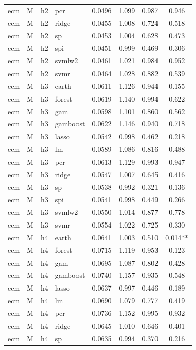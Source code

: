 \begin{ThreePartTable}
\begin{longtable}[t]{llclcccc}
ecm & M & h2 & pcr & 0.0496 & 1.099 & 0.987 & 0.946\\
ecm & M & h2 & ridge & 0.0455 & 1.008 & 0.724 & 0.518\\
ecm & M & h2 & sp & 0.0453 & 1.004 & 0.628 & 0.473\\
ecm & M & h2 & spi & 0.0451 & 0.999 & 0.469 & 0.306\\
ecm & M & h2 & svmlw2 & 0.0461 & 1.021 & 0.984 & 0.952\\
ecm & M & h2 & svmr & 0.0464 & 1.028 & 0.882 & 0.539\\
\addlinespace
ecm & M & h3 & earth & 0.0611 & 1.126 & 0.944 & 0.155\\
ecm & M & h3 & forest & 0.0619 & 1.140 & 0.994 & 0.622\\
ecm & M & h3 & gam & 0.0598 & 1.101 & 0.860 & 0.562\\
ecm & M & h3 & gamboost & 0.0622 & 1.146 & 0.940 & 0.718\\
ecm & M & h3 & lasso & 0.0542 & 0.998 & 0.462 & 0.218\\
ecm & M & h3 & lm & 0.0589 & 1.086 & 0.816 & 0.488\\
ecm & M & h3 & pcr & 0.0613 & 1.129 & 0.993 & 0.947\\
ecm & M & h3 & ridge & 0.0547 & 1.007 & 0.645 & 0.416\\
ecm & M & h3 & sp & 0.0538 & 0.992 & 0.321 & 0.136\\
ecm & M & h3 & spi & 0.0541 & 0.998 & 0.449 & 0.266\\
ecm & M & h3 & svmlw2 & 0.0550 & 1.014 & 0.877 & 0.778\\
ecm & M & h3 & svmr & 0.0554 & 1.022 & 0.725 & 0.330\\
\addlinespace
ecm & M & h4 & earth & 0.0641 & 1.003 & 0.510 & 0.014**\\
ecm & M & h4 & forest & 0.0715 & 1.119 & 0.953 & 0.123\\
ecm & M & h4 & gam & 0.0695 & 1.087 & 0.802 & 0.428\\
ecm & M & h4 & gamboost & 0.0740 & 1.157 & 0.935 & 0.548\\
ecm & M & h4 & lasso & 0.0637 & 0.997 & 0.446 & 0.189\\
ecm & M & h4 & lm & 0.0690 & 1.079 & 0.777 & 0.419\\
ecm & M & h4 & pcr & 0.0736 & 1.152 & 0.995 & 0.932\\
ecm & M & h4 & ridge & 0.0645 & 1.010 & 0.646 & 0.401\\
ecm & M & h4 & sp & 0.0635 & 0.994 & 0.370 & 0.216\\

\end{longtable}
\end{ThreePartTable}
